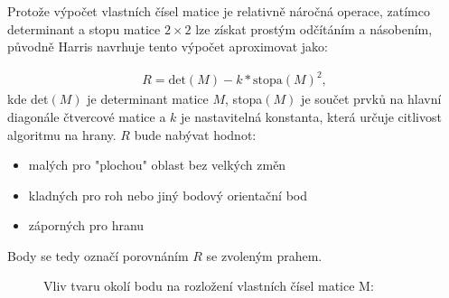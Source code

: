 %

Protože výpočet vlastních čísel matice je relativně náročná operace, zatímco determinant a stopu matice $2\times2$ lze získat prostým odčítáním a násobením, původně Harris navrhuje tento výpočet aproximovat jako:

\begin{align}
R = \text{det}(M) - k * \text{stopa}(M)^2,
\end{align}
kde det$(M)$ je determinant matice $M$, stopa$(M)$ je součet prvků na hlavní diagonále čtvercové matice a $k$ je nastavitelná konstanta, která určuje citlivost algoritmu na hrany. $R$ bude nabývat hodnot:
\begin{itemize}
	\item malých pro "plochou" oblast bez velkých změn
	\item kladných pro roh nebo jiný bodový orientační bod
	\item záporných pro hranu
\end{itemize} 

Body se tedy označí porovnáním $R$ se zvoleným prahem.

\begin{figure}[htp] 
	\label{Harris_eigen}
	\caption{Vliv tvaru okolí bodu na rozložení vlastních čísel matice M:}
\end{figure}



